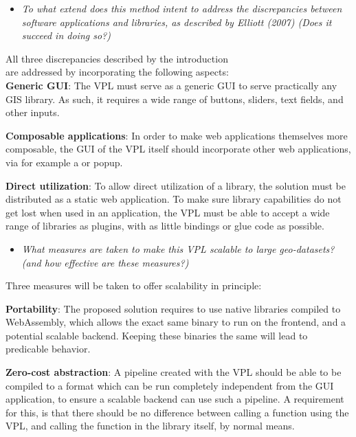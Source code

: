\begin{itemize}[ ]
  \item \emph{To what extend does this method intent to address the discrepancies between software
applications and libraries, as described by Elliott (2007) (Does it succeed in doing so?)}
\end{itemize}

All three discrepancies described by the introduction \\ are addressed by incorporating the following aspects: \\

\textbf{Generic GUI}: The VPL must serve as a generic \ac{GUI} to serve practically any \ac{GIS} library. 
As such, it requires a wide range of buttons, sliders, text fields, and other inputs.

\textbf{Composable applications}: In order to make web applications themselves more composable, the \ac{GUI} of the VPL itself should incorporate other web applications, via for example a  or popup.

\textbf{Direct utilization}: To allow direct utilization of a library, the solution must be distributed as a static web application. 
To make sure library capabilities do not get lost when used in an application, the VPL must be able to accept a wide range of libraries as plugins, with as little bindings or glue code as possible.


\begin{itemize}[ ]
  \item \emph{What measures are taken to make this VPL scalable to large geo-datasets? (and how
  effective are these measures?)}
\end{itemize}

Three measures will be taken to offer scalability in principle: 

\textbf{Portability}: The proposed solution requires to use native libraries compiled to WebAssembly, which allows the exact same binary to run on the frontend, and a potential scalable backend. 
Keeping these binaries the same will lead to predicable behavior. 

\textbf{Zero-cost abstraction}: A pipeline created with the VPL should be able to be compiled to a format which can be run completely independent from the \ac{GUI} application, to ensure a scalable backend can use such a pipeline.
A requirement for this, is that there should be no difference between calling a function using the VPL, and calling the function in the library itself, by normal means. 

